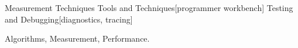 \documentclass[preprint]{sigplanconf}
\begin{document}
%
%

 {Measurement Techniques}
 {Tools and Techniques}[programmer workbench]
 {Testing and Debugging}[diagnostics, tracing]

\terms Algorithms, Measurement, Performance.
\end{document}
